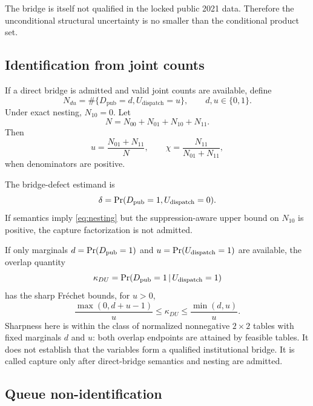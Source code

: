 \documentclass[11pt]{article}
\begin{document}
The bridge is itself not qualified in the locked public 2021 data. Therefore the unconditional structural uncertainty is no smaller than the conditional product set.

\subsection{Identification from joint counts}

If a direct bridge is admitted and valid joint counts are available, define
\begin{equation}
N_{du}=\#\{D_{\mathrm{pub}}=d,U_{\mathrm{dispatch}}=u\},
\qquad d,u\in\{0,1\}.
\end{equation}
Under exact nesting, $N_{10}=0$. Let
\begin{equation}
N=N_{00}+N_{01}+N_{10}+N_{11}.
\end{equation}
Then
\begin{equation}
u=\frac{N_{01}+N_{11}}{N},
\qquad
\chi=\frac{N_{11}}{N_{01}+N_{11}},
\label{eq:jointidentify}
\end{equation}
when denominators are positive.

The bridge-defect estimand is
\begin{equation}
\delta=\Pr(D_{\mathrm{pub}}=1,U_{\mathrm{dispatch}}=0).
\end{equation}
If semantics imply \cref{eq:nesting} but the suppression-aware upper bound on $N_{10}$ is positive, the capture factorization is not admitted.

If only marginals $d=\Pr(D_{\mathrm{pub}}=1)$ and $u=\Pr(U_{\mathrm{dispatch}}=1)$ are available, the overlap quantity
\begin{equation}
\kappa_{DU}=\Pr(D_{\mathrm{pub}}=1\,|\, U_{\mathrm{dispatch}}=1)
\end{equation}
has the sharp Fr\'echet bounds, for $u>0$,
\begin{equation}
\frac{\max(0,d+u-1)}{u}
\le\kappa_{DU}\le
\frac{\min(d,u)}{u}.
\label{eq:frechet}
\end{equation}
Sharpness here is within the class of normalized nonnegative $2\times2$ tables with fixed marginals $d$ and $u$: both overlap endpoints are attained by feasible tables. It does not establish that the variables form a qualified institutional bridge.
It is called capture only after direct-bridge semantics and nesting are admitted.

\subsection{Queue non-identification}
\end{document}
